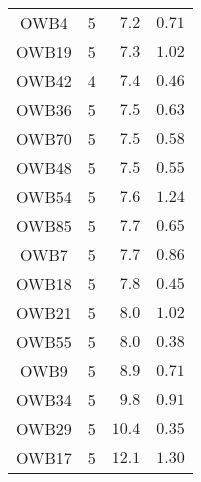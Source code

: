 \begin{longtable}{crrr}
OWB4 & 5 & $7.2$ & $0.71$ \\ 
OWB19 & 5 & $7.3$ & $1.02$ \\ 
OWB42 & 4 & $7.4$ & $0.46$ \\ 
OWB36 & 5 & $7.5$ & $0.63$ \\ 
OWB70 & 5 & $7.5$ & $0.58$ \\ 
OWB48 & 5 & $7.5$ & $0.55$ \\ 
OWB54 & 5 & $7.6$ & $1.24$ \\ 
OWB85 & 5 & $7.7$ & $0.65$ \\ 
OWB7 & 5 & $7.7$ & $0.86$ \\ 
OWB18 & 5 & $7.8$ & $0.45$ \\ 
OWB21 & 5 & $8.0$ & $1.02$ \\ 
OWB55 & 5 & $8.0$ & $0.38$ \\ 
OWB9 & 5 & $8.9$ & $0.71$ \\ 
OWB34 & 5 & $9.8$ & $0.91$ \\ 
OWB29 & 5 & $10.4$ & $0.35$ \\ 
OWB17 & 5 & $12.1$ & $1.30$ \\ 
\bottomrule
\end{longtable}

